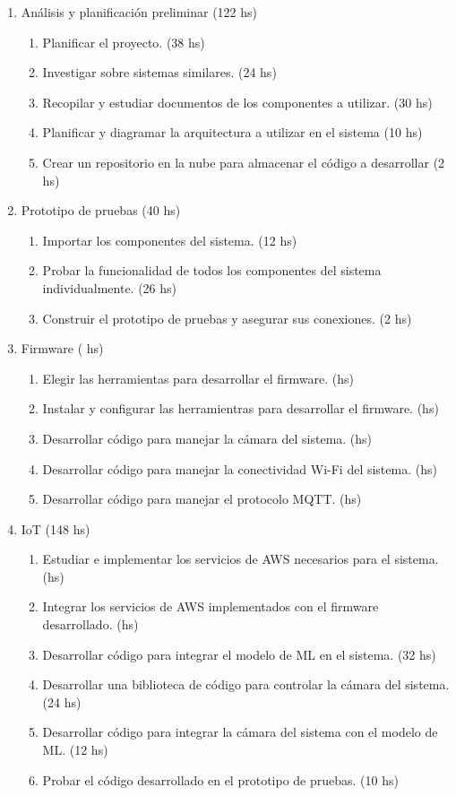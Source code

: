 \documentclass[
11pt, %
]{plan}
\begin{document}
\begin{enumerate}
\item Análisis y planificación preliminar (122 hs)
	\begin{enumerate}
		\item Planificar el proyecto. (38 hs)
		\item Investigar sobre sistemas similares. (24 hs)
		\item Recopilar y estudiar documentos de los componentes a utilizar. (30 hs)
		\item Planificar y diagramar la arquitectura a utilizar en el sistema (10 hs)
		\item Crear un repositorio en la nube para almacenar el código a desarrollar (2 hs)
	\end{enumerate}
	
\item Prototipo de pruebas (40 hs)
	\begin{enumerate}
		\item Importar los componentes del sistema. (12 hs)
		\item Probar la funcionalidad de todos los componentes del sistema individualmente. (26 hs)
		\item Construir el prototipo de pruebas y asegurar sus conexiones. (2 hs)
	\end{enumerate}
	
\item Firmware ( hs)
	\begin{enumerate}
		\item Elegir las herramientas para desarrollar el firmware. (hs)
		\item Instalar y configurar las herramientras para desarrollar el firmware. (hs)
		\item Desarrollar código para manejar la cámara del sistema. (hs)
		\item Desarrollar código para manejar la conectividad Wi-Fi del sistema. (hs)
		\item Desarrollar código para manejar el protocolo MQTT. (hs)
	\end{enumerate}
	
\item IoT (148 hs)
	\begin{enumerate}
		\item Estudiar e implementar los servicios de AWS necesarios para el sistema. (hs)
		\item Integrar los servicios de AWS implementados con el firmware desarrollado. (hs)
		\item Desarrollar código para integrar el modelo de ML en el sistema. (32 hs)
		\item Desarrollar una biblioteca de código para controlar la cámara del sistema. (24 hs)
		\item Desarrollar código para integrar la cámara del sistema con el modelo de ML. (12 hs)
		\item Probar el código desarrollado en el prototipo de pruebas. (10 hs)
	\end{enumerate}


\end{enumerate}
\end{document}

